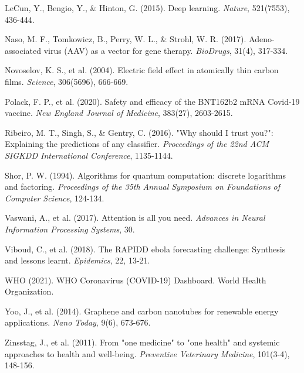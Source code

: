 \documentclass[12pt,a4paper,twoside,openright,openany]{book}
\begin{document}
\begin{thebibliography}{99}
		LeCun, Y., Bengio, Y., \& Hinton, G. (2015). Deep learning.
		\textit{Nature}, 521(7553), 436-444.
		
		Naso, M. F., Tomkowicz, B., Perry, W. L., \& Strohl, W. R. (2017). Adeno-associated virus (AAV) as a vector for gene therapy.
		\textit{BioDrugs}, 31(4), 317-334.
		
		Novoselov, K. S., et al. (2004). Electric field effect in atomically thin carbon films.
		\textit{Science}, 306(5696), 666-669.
		
		Polack, F. P., et al. (2020). Safety and efficacy of the BNT162b2 mRNA Covid-19 vaccine.
		\textit{New England Journal of Medicine}, 383(27), 2603-2615.
		
		Ribeiro, M. T., Singh, S., \& Gentry, C. (2016). "Why should I trust you?": Explaining the predictions of any classifier.
		\textit{Proceedings of the 22nd ACM SIGKDD International Conference}, 1135-1144.
		
		Shor, P. W. (1994). Algorithms for quantum computation: discrete logarithms and factoring.
		\textit{Proceedings of the 35th Annual Symposium on Foundations of Computer Science}, 124-134.
		
		Vaswani, A., et al. (2017). Attention is all you need.
		\textit{Advances in Neural Information Processing Systems}, 30.
		
		Viboud, C., et al. (2018). The RAPIDD ebola forecasting challenge: Synthesis and lessons learnt.
		\textit{Epidemics}, 22, 13-21.
		
		WHO (2021). WHO Coronavirus (COVID-19) Dashboard.
		World Health Organization.
		
		Yoo, J., et al. (2014). Graphene and carbon nanotubes for renewable energy applications.
		\textit{Nano Today}, 9(6), 673-676.
		
		Zinsstag, J., et al. (2011). From "one medicine" to "one health" and systemic approaches to health and well-being.
		\textit{Preventive Veterinary Medicine}, 101(3-4), 148-156.
		
	\end{thebibliography}
	
\end{document}
